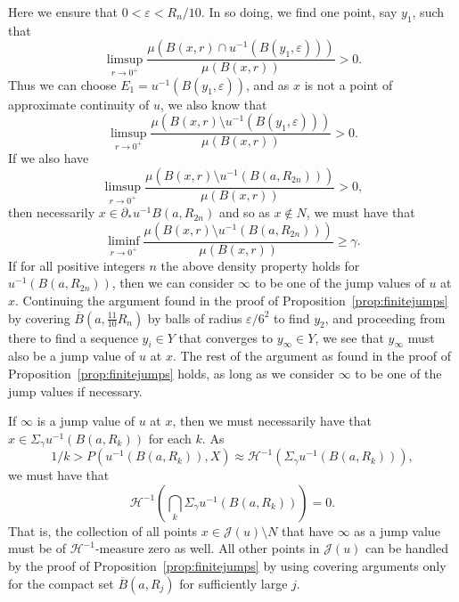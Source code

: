 \documentclass[11pt, letterpaper]{amsart} %
\newcommand*{\eps}{\varepsilon}
\numberwithin{equation}{section}
\theoremstyle{plain}
\theoremstyle{definition}
\begin{document}
{Here we ensure that $0<\eps<R_n/10$.
In so doing, we find one point, say $y_1$, such that 
\[
\limsup_{r\to 0^+}\frac{\mu(B(x,r)\cap u^{-1}(B(y_1,\eps)))}{\mu(B(x,r))}>0.
\]
Thus we can choose $E_1=u^{-1}(B(y_1,\eps))$, and as $x$ is not a point of
approximate continuity of $u$, we also know that
\[
\limsup_{r\to 0^+}\frac{\mu(B(x,r)\setminus u^{-1}(B(y_1,\eps)))}{\mu(B(x,r))}>0.
\]
If we also have
\[
\limsup_{r\to 0^+}\frac{\mu(B(x,r)\setminus u^{-1}(B(a,R_{2n})))}{\mu(B(x,r))}>0,
\]
then necessarily $x\in \partial_*u^{-1}B(a,R_{2n})$ and so as $x\not\in N$, we must have
that
\[
\liminf_{r\to 0^+}\frac{\mu(B(x,r)\setminus u^{-1}(B(a,R_{2n})))}{\mu(B(x,r))}\ge \gamma.
\]
If for all positive integers $n$ the above density property holds for $u^{-1}(B(a,R_{2n}))$, then
we can consider $\infty$ to be one of the jump values of $u$ at $x$. Continuing the argument
found in the proof of Proposition~\ref{prop:finitejumps} by covering $\overline{B}(a,\tfrac{11}{10}R_n)$
by balls of radius $\eps/6^2$ to find $y_2$, and proceeding from there to find a sequence $y_i\in Y$
that converges to $y_\infty\in Y$, we see that $y_\infty$ must also be a jump value of $u$ at $x$.
The rest of the argument as found in the proof of Proposition~\ref{prop:finitejumps} holds, as long as 
we consider $\infty$ to be one of the jump values if necessary.


If $\infty$ is a jump value of $u$ at $x$, then we must necessarily have that 
$x\in\Sigma_\gamma u^{-1}(B(a,R_k))$ for each $k$. As 
\[
1/k>P(u^{-1}(B(a,R_k)), X)\approx\mathcal{H}^{-1}(\Sigma_\gamma u^{-1}(B(a,R_k))),
\]
we must have that 
\[
\mathcal{H}^{-1}(\bigcap_k \Sigma_\gamma u^{-1}(B(a,R_k)))=0.
\]
That is, the collection of all points $x\in\mathcal{J}(u)\setminus N$ that have $\infty$ as a jump value must
be of $\mathcal{H}^{-1}$-measure zero as well. All other points in $\mathcal{J}(u)$ can be handled by the 
proof of Proposition~\ref{prop:finitejumps} by using covering arguments only for the compact set $\overline{B}(a,R_j)$ for
sufficiently large $j$.













}
\end{document}
